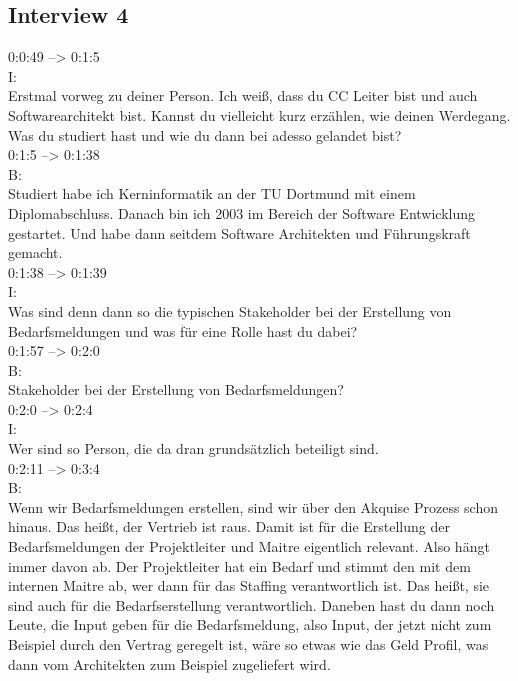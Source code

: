 \subsection{Interview 4}
\label{interview4}
0:0:49 --> 0:1:5\\
I:\\
Erstmal vorweg zu deiner Person. Ich weiß, dass du CC Leiter bist und auch Softwarearchitekt bist. Kannst du vielleicht kurz erzählen, wie deinen Werdegang. Was du studiert hast und wie du dann bei adesso gelandet bist?\\

0:1:5 --> 0:1:38\\
B:\\
Studiert habe ich Kerninformatik an der TU Dortmund mit einem Diplomabschluss. Danach bin ich 2003 im Bereich der Software Entwicklung gestartet. Und habe dann seitdem Software Architekten und Führungskraft gemacht.\\

0:1:38 --> 0:1:39\\
I:\\
Was sind denn dann so die typischen Stakeholder bei der Erstellung von Bedarfsmeldungen und was für eine Rolle hast du dabei?\\

0:1:57 --> 0:2:0\\
B:\\
Stakeholder bei der Erstellung von Bedarfsmeldungen?\\

0:2:0 --> 0:2:4\\
I:\\
Wer sind so Person, die da dran grundsätzlich beteiligt sind.\\

0:2:11 --> 0:3:4\\
B:\\
Wenn wir Bedarfsmeldungen erstellen, sind wir über den Akquise Prozess schon hinaus. Das heißt, der Vertrieb ist raus. Damit ist für die Erstellung der Bedarfsmeldungen der Projektleiter und Maitre eigentlich relevant. Also hängt immer davon ab. Der Projektleiter hat ein Bedarf und stimmt den mit dem internen Maitre ab, wer dann für das Staffing verantwortlich ist. Das heißt, sie sind auch für die Bedarfserstellung verantwortlich. Daneben hast du dann noch Leute, die Input geben für die Bedarfsmeldung, also Input, der jetzt nicht zum Beispiel durch den Vertrag geregelt ist, wäre so etwas wie das Geld Profil, was dann vom Architekten zum Beispiel zugeliefert wird.\\

